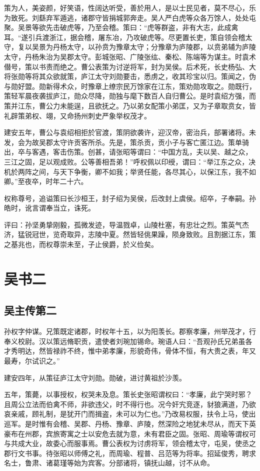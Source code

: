 \documentclass[12pt,UTF8]{ctexbook}
\begin{document}
策为人，美姿颜，好笑语，性阔达听受，善於用人，是以士民见者，莫不尽心，乐为致死。刘繇弃军遁逃，诸郡守皆捐城郭奔走。吴人严白虎等众各万馀人，处处屯聚。吴景等欲先击破虎等，乃至会稽。策曰：“虎等群盗，非有大志，此成禽耳。“遂引兵渡浙江，据会稽，屠东冶，乃攻破虎等。尽更置长吏，策自领会稽太守，复以吴景为丹杨太守，以孙贲为豫章太守；分豫章为庐陵郡，以贲弟辅为庐陵太守，丹杨朱治为吴郡太守。彭城张昭、广陵张纮、秦松、陈端等为谋主。时袁术僣号，策以书责而绝之。曹公表策为讨逆将军，封为吴侯。后术死，长史杨弘、大将张勋等将其众欲就策，庐江太守刘勋要击，悉虏之，收其珍宝以归。策闻之，伪与勋好盟。勋新得术众，时豫章上缭宗民万馀家在江东，策劝勋攻取之。勋既行，策轻军晨夜袭拔庐江，勋众尽降，勋独与麾下数百人自归曹公。是时袁绍方强，而策并江东，曹公力未能逞，且欲抚之。乃以弟女配策小弟匡，又为子章取贲女，皆礼辟策弟权、翊，又命扬州刺史严象举权茂才。

建安五年，曹公与袁绍相拒於官渡，策阴欲袭许，迎汉帝，密治兵，部署诸将。未发，会为故吴郡太守许贡客所杀。先是，策杀贡，贡小子与客亡匿江边。策单骑出，卒与客遇，客击伤策。创甚，请张昭等谓曰：“中国方乱，夫以吴、越之众，三江之固，足以观成败。公等善相吾弟！”呼权佩以印绶，谓曰：“举江东之众，决机於两阵之间，与天下争衡，卿不如我；举贤任能，各尽其心，以保江东，我不如卿。”至夜卒，时年二十六。

权称尊号，追谥策曰长沙桓王，封子绍为吴侯，后改封上虞侯。绍卒，子奉嗣。孙皓时，讹言谓奉当立，诛死。

评曰：孙坚勇挚刚毅，孤微发迹，导温戮卓，山陵杜塞，有忠壮之烈。策英气杰济，猛锐冠世，览奇取异，志陵中夏。然皆轻佻果躁，陨身致败。且割据江东，策之基兆也，而权尊崇未至，子止侯爵，於义俭矣。

\part{吴书二}
\chapter{吴主传第二}

孙权字仲谋。兄策既定诸郡，时权年十五，以为阳羡长。郡察孝廉，州举茂才，行奉义校尉。汉以策远脩职贡，遣使者刘琬加锡命。琬语人曰：“吾观孙氏兄弟虽各才秀明达，然皆禄祚不终，惟中弟孝廉，形貌奇伟，骨体不恒，有大贵之表，年又最寿，尔试识之。”

建安四年，从策征庐江太守刘勋。勋破，进讨黄祖於沙羡。

五年，策薨，以事授权，权哭未及息。策长史张昭谓权曰：“孝廉，此宁哭时邪？且周公立法而伯禽不师，非欲违父，时不得行也。况今奸宄竞逐，豺狼满道，乃欲哀亲戚，顾礼制，是犹开门而揖盗，未可以为仁也。”乃改易权服，扶令上马，使出巡军。是时惟有会稽、吴郡、丹杨、豫章、庐陵，然深险之地犹未尽从，而天下英豪布在州郡，宾旅寄寓之士以安危去就为意，未有君臣之固。张昭、周瑜等谓权可与共成大业，故委心而服事焉。曹公表权为讨虏将军，领会稽太守，屯吴，使丞之郡行文书事。待张昭以师傅之礼，而周瑜、程普、吕范等为将率。招延俊秀，聘求名士，鲁肃、诸葛瑾等始为宾客。分部诸将，镇抚山越，讨不从命。
\end{document}
